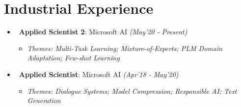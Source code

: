 \section{\mysidestyle Industrial Experience}
\vspace{0mm}
\begin{itemize}[leftmargin=*]\compresslist
\item~\textbf{Applied Scientist 2}: Microsoft AI \hfill{\small\textit{(May'20 - Present)}} \vspace{-1mm}
\begin{itemize}[leftmargin=*]\compresslist
        \item[]\small\textit{Themes: Multi-Task Learning; Mixture-of-Experts; PLM Domain Adaptation; Few-shot Learning}
    \end{itemize}

\item~\textbf{Applied Scientist}: Microsoft AI \hfill{\small\textit{(Apr'18 - May'20)}} \vspace{-1mm}
\begin{itemize}[leftmargin=*]\compresslist
        \item[]\small\textit{Themes: Dialogue Systems; Model Compression; Responsible AI; Text Generation}
    \end{itemize}
\end{itemize}